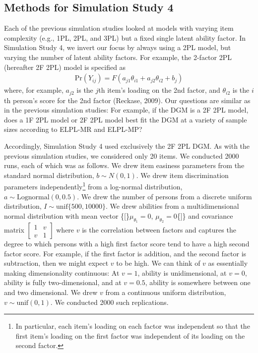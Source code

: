 \documentclass[
  english,
  man,floatsintext]{apa7}
\begin{document}
\hypertarget{methods-for-simulation-study-4}{%
\subsection{Methods for Simulation Study 4}\label{methods-for-simulation-study-4}}

Each of the previous simulation studies looked at models with varying item complexity (e.g., 1PL, 2PL, and 3PL) but a fixed single latent ability factor. In Simulation Study 4, we invert our focus by always using a 2PL model, but varying the number of latent ability factors. For example, the 2-factor 2PL (hereafter 2F 2PL) model is specified as
\begin{align}
\text{Pr}(Y_{ij}) = F(a_{j1}\theta_{i1} + a_{j2} \theta_{i2} + b_j)
\end{align}
where, for example, \(a_{j2}\) is the \(j\)th item's loading on the 2nd factor, and \(\theta_{i2}\) is the \(i\)th person's score for the 2nd factor (Reckase, 2009). Our questions are similar as in the previous simulation studies: For example, if the DGM is a 2F 2PL model, does a 1F 2PL model or 2F 2PL model best fit the DGM at a variety of sample sizes according to ELPL-MR and ELPL-MP?

Accordingly, Simulation Study 4 used exclusively the 2F 2PL DGM. As with the previous simulation studies, we considered only 20 items. We conducted 2000 runs, each of which was as follows. We drew item easiness parameters from the standard normal distribution, \(b \sim N(0, 1)\). We drew item discrimination parameters independently\footnote{In particular, each item's loading on each factor was independent so that the first item's loading on the first factor was independent of its loading on the second factor.} from a log-normal distribution, \(a \sim \text{Lognormal}(0, 0.5)\). We drew the number of persons from a discrete uniform distribution, \(I \sim \text{unif}\{500, 10000\}\). We drew abilities from a multidimensional normal distribution with mean vector \{{[}\}\(\mu_{\theta_1} = 0\), \(\mu_{\theta_2} = 0\)\{{]}\} and covariance matrix \(\begin{bmatrix} 1 & v \\ v & 1 \end{bmatrix}\) where \(v\) is the correlation between factors and captures the degree to which persons with a high first factor score tend to have a high second factor score. For example, if the first factor is addition, and the second factor is subtraction, then we might expect \(v\) to be high. We can think of \(v\) as essentially making dimensionality continuous: At \(v = 1\), ability is unidimensional, at \(v = 0\), ability is fully two-dimensional, and at \(v = 0.5\), ability is somewhere between one and two dimensional. We drew \(v\) from a continuous uniform distribution, \(v \sim \text{unif}(0, 1)\). We conducted 2000 such replications.
\end{document}
